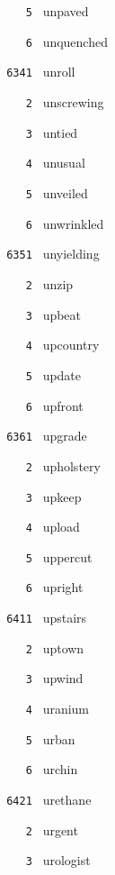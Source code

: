 \documentclass[11pt]{article}
\begin{document}
\begin{multicols}{6}
\noindent \texttt{ \ \ \ 5 } unpaved  \par
\noindent \texttt{ \ \ \ 6 } unquenched  \par
\vspace{3mm}
\noindent \texttt{ 6341 } unroll  \par
\noindent \texttt{ \ \ \ 2 } unscrewing  \par
\noindent \texttt{ \ \ \ 3 } untied  \par
\noindent \texttt{ \ \ \ 4 } unusual  \par
\noindent \texttt{ \ \ \ 5 } unveiled  \par
\noindent \texttt{ \ \ \ 6 } unwrinkled  \par
\vspace{3mm}
\noindent \texttt{ 6351 } unyielding  \par
\noindent \texttt{ \ \ \ 2 } unzip  \par
\noindent \texttt{ \ \ \ 3 } upbeat  \par
\noindent \texttt{ \ \ \ 4 } upcountry  \par
\noindent \texttt{ \ \ \ 5 } update  \par
\noindent \texttt{ \ \ \ 6 } upfront  \par
\vspace{3mm}
\noindent \texttt{ 6361 } upgrade  \par
\noindent \texttt{ \ \ \ 2 } upholstery  \par
\noindent \texttt{ \ \ \ 3 } upkeep  \par
\noindent \texttt{ \ \ \ 4 } upload  \par
\noindent \texttt{ \ \ \ 5 } uppercut  \par
\noindent \texttt{ \ \ \ 6 } upright  \par
\noindent \texttt{ 6411 } upstairs  \par
\noindent \texttt{ \ \ \ 2 } uptown  \par
\noindent \texttt{ \ \ \ 3 } upwind  \par
\noindent \texttt{ \ \ \ 4 } uranium  \par
\noindent \texttt{ \ \ \ 5 } urban  \par
\noindent \texttt{ \ \ \ 6 } urchin  \par
\vspace{3mm}
\noindent \texttt{ 6421 } urethane  \par
\noindent \texttt{ \ \ \ 2 } urgent  \par
\noindent \texttt{ \ \ \ 3 } urologist  \par

\end{multicols}
\end{document}
